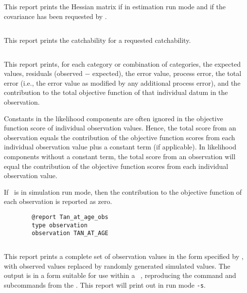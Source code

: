 This report prints the Hessian matrix if in estimation run mode and if the covariance has been requested by .

\subsection{}\label{sec:Report-Catchability}

This report prints the catchability for a requested catchability.

\subsection{}\label{sec:Report-Observation}

This report prints, for each category or combination of categories, the expected values, residuals (observed $-$ expected), the error value, process error, the total error (i.e., the error value as modified by any additional process error), and the contribution to the total objective function of that individual datum in the observation.

Constants in the likelihood components are often ignored in the objective function score of individual observation values. Hence, the total score from an observation equals the contribution of the objective function scores from each individual observation value plus a constant term (if applicable). In likelihood components without a constant term, the total score from an observation will equal the contribution of the objective function scores from each individual observation value.

If \CNAME\ is in simulation run mode, then the contribution to the objective function of each observation is reported as zero.

\begin{verbatim}
		@report Tan_at_age_obs
		type observation
		observation TAN_AT_AGE
\end{verbatim}

\subsection{}\label{sec:Report-SimulatedObservation}

This report prints a complete set of observation values in the form specified by , with observed values replaced by randomly generated simulated values. The output is in a form  suitable for use within a \CNAME\ \config, reproducing the command and subcommands from the \config. This report will print out in run mode \texttt{-s}.


